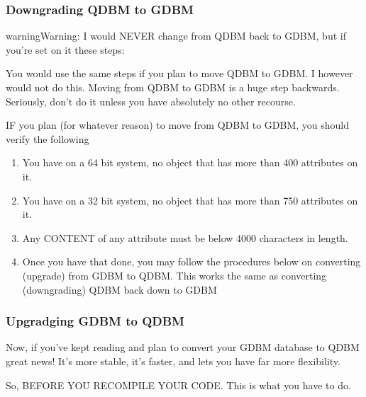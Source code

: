 \documentclass[letterpaper,10pt,english]{sphinxmanual}
\begin{document}
\subsubsection{Downgrading QDBM to GDBM}
\label{\detokenize{upgrade:downgrading-qdbm-to-gdbm}}
\begin{sphinxadmonition}{warning}{Warning:}
\sphinxAtStartPar
I would NEVER change from QDBM back to GDBM, but if you’re set on it these steps:

\sphinxAtStartPar
You would use the same steps if you plan to move QDBM to GDBM.  I however would
not do this.  Moving from QDBM to GDBM is a huge step backwards.  Seriously,
don’t do it unless you have absolutely no other recourse.

\sphinxAtStartPar
IF you plan (for whatever reason) to move from QDBM to GDBM, you should verify
the following
\end{sphinxadmonition}
\begin{enumerate}
%
\item {} 
\sphinxAtStartPar
You have on a 64 bit system, no object that has more than 400 attributes on it.

\item {} 
\sphinxAtStartPar
You have on a 32 bit system, no object that has more than 750 attributes on it.

\item {} 
\sphinxAtStartPar
Any CONTENT of any attribute must be below 4000 characters in length.

\item {} 
\sphinxAtStartPar
Once you have that done, you may follow the procedures below on converting (upgrade) from GDBM to QDBM.  This works the same as converting (downgrading) QDBM back down to GDBM

\end{enumerate}


\subsubsection{Upgradging GDBM to QDBM}
\label{\detokenize{upgrade:upgradging-gdbm-to-qdbm}}
\sphinxAtStartPar
Now, if you’ve kept reading and plan to convert your GDBM database to QDBM great news!
It’s more stable, it’s faster, and lets you have far more flexibility.

\sphinxAtStartPar
So, BEFORE YOU RECOMPILE YOUR CODE.  This is what you have to do.
\end{document}
